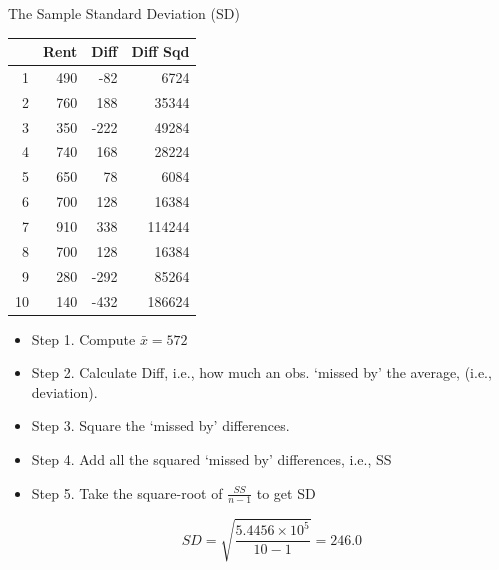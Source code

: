 \documentclass[14pt]{beamer}\usepackage[]{graphicx}\usepackage[]{color}
\begin{document}
\begin{frame}[fragile]{The Sample Standard Deviation (SD)}

\begin{minipage}[ht]{5cm}

{\footnotesize{
\begin{table}[ht]
\centering
\begin{tabular}{rrrr}
  \hline
 & Rent & Diff & Diff Sqd \\ 
  \hline
1 & 490 & -82 & 6724 \\ 
  2 & 760 & 188 & 35344 \\ 
  3 & 350 & -222 & 49284 \\ 
  4 & 740 & 168 & 28224 \\ 
  5 & 650 & 78 & 6084 \\ 
  6 & 700 & 128 & 16384 \\ 
  7 & 910 & 338 & 114244 \\ 
  8 & 700 & 128 & 16384 \\ 
  9 & 280 & -292 & 85264 \\ 
  10 & 140 & -432 & 186624 \\ 
   \hline
\end{tabular}
\end{table}

}}

\end{minipage}
\begin{minipage}[ht]{6cm}

{\footnotesize{
\begin{itemize}
\item<1-> Step 1. Compute $\bar{x} = 572$
\item<2-> Step 2. Calculate Diff, i.e., how much an obs. `missed by' the average, (i.e., deviation).
\item<3-> Step 3. Square the `missed by' differences.
\item<4-> Step 4. Add all the squared `missed by' differences, i.e., SS
\item<5-> Step 5. Take the square-root of $\frac{SS}{n - 1}$ to get SD

\begin{equation*}
SD = \sqrt{ \frac{\ensuremath{5.4456\times 10^{5}}}{ 10 - 1 }} = 246.0
\end{equation*}

\end{itemize}
}}
\end{minipage}

\end{frame}
\end{document}
